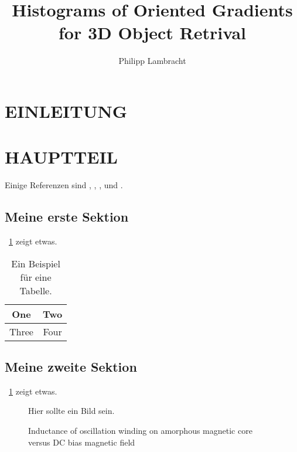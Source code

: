 \documentclass[a4paper, 10pt, conference]{ieeeconf_de}
\title{\LARGE \bf
	Histograms of Oriented Gradients for 3D Object Retrival
}
\author{Philipp Lambracht}
\begin{document}
\maketitle
\thispagestyle{empty}
\pagestyle{empty}



\begin{abstract}

	

\end{abstract}


\section{EINLEITUNG}


\section{HAUPTTEIL}

Einige Referenzen sind \cite{Hartley03}, \cite{Arulampalam02}, \cite{scherer2010histograms} , \cite{dalal2005histograms} und \cite{Kaestner05}.

\subsection{Meine erste Sektion} 
\tablename~\ref{table_example} zeigt etwas.

\begin{table}
\caption{Ein Beispiel für eine Tabelle.}
\label{table_example}
\begin{center}
\begin{tabular}{|c||c|}
\hline
One & Two\\
\hline
Three & Four\\
\hline
\end{tabular}
\end{center}
\end{table}


\subsection{Meine zweite Sektion}

\figurename~\ref{figurelabel} zeigt etwas.

   \begin{figure}[thpb]
      \centering
			Hier sollte ein Bild sein.
      \caption{Inductance of oscillation winding on amorphous
       magnetic core versus DC bias magnetic field}
      \label{figurelabel}
   \end{figure}
\end{document}

